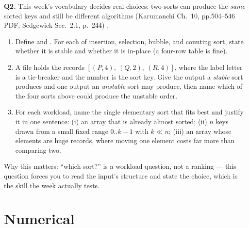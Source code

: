 \documentclass[11pt]{article}
\begin{document}
\textbf{Q2.} This week's vocabulary decides real choices: two sorts can produce the \emph{same} sorted keys and still be different algorithms (Karumanchi Ch.~10, pp.504--546 PDF; Sedgewick Sec.~2.1, p.~244) \cite{Karumanchi2017_data_structures_algorithms_made_easy,Sedgewick2011_algorithms}.
\begin{enumerate}
  \item[(a)] Define  and . For each of insertion, selection, bubble, and counting sort, state whether it is stable and whether it is in-place (a four-row table is fine).
  \item[(b)] A file holds the records $[(P,4),\ (Q,2),\ (R,4)]$, where the label letter is a tie-breaker and the number is the sort key. Give the output a \emph{stable} sort produces and one output an \emph{unstable} sort may produce, then name which of the four sorts above could produce the unstable order.
  \item[(c)] For each workload, name the single elementary sort that fits best and justify it in one sentence: (i) an array that is already almost sorted; (ii) $n$ keys drawn from a small fixed range $0..k-1$ with $k \ll n$; (iii) an array whose elements are huge records, where moving one element costs far more than comparing two.
\end{enumerate}
Why this matters: ``which sort?'' is a workload question, not a ranking --- this question forces you to read the input's structure and state the choice, which is the skill the week actually tests.

\section{Numerical}
\end{document}
